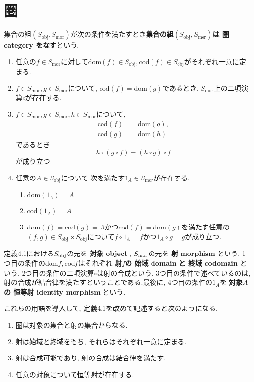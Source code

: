 \section{圏}
\begin{Def}
集合の組$(S_{\mathrm{obj}},S_{\mathrm{mor}})$が次の条件を満たすとき{\bf 集合の組$(S_{\mathrm{obj}},S_{\mathrm{mor}})$は
圏 category
をなす}という.
\begin{enumerate}
\item 任意の$f\in S_\mathrm{mor}$に対して$\mathrm{dom}(f)\in S_\mathrm{obj},\mathrm{cod}(f)\in S_\mathrm{obj}$がそれぞれ一意に定まる.
\item $f\in S_{\mathrm{mor}},g\in S_{\mathrm{mor}}$について,
$\mathrm{cod}(f)=\mathrm{dom}(g)$であるとき,
$S_{\mathrm{mor}}$上の二項演算$\circ$が存在する.
\item $f\in S_{\mathrm{mor}},g\in S_{\mathrm{mor}},h\in S_{\mathrm{mor}}$について, \begin{align*}
\mathrm{cod}(f)&=\mathrm{dom}(g),\\ \mathrm{cod}(g)&=\mathrm{dom}(h)
\end{align*}であるとき
\[
h\circ(g\circ f)=(h\circ g)\circ f
\]
が成り立つ.
\item 任意の$A\in S_{\mathrm{obj}}$について
次を満たす$1_A\in S_{\mathrm{mor}}$が存在する.
\begin{enumerate}
\item
$\mathrm{dom}(1_{A})=A$
\item
$\mathrm{cod}(1_A)=A$
\item $\mathrm{dom}(f)=\mathrm{cod} (g)=A$かつ$\mathrm{cod} (f)=\mathrm{dom}(g)$を満たす任意の$(f,g)\in S_{\mathrm{obj}}\times S_{\mathrm{obj}}$について$f\circ 1_A=f$かつ$1_A\circ g=g$が成り立つ.
\end{enumerate}
\end{enumerate}
\end{Def}
定義4.1における$S_{\rm obj}$の元を
{\bf 
対象 object
}, 
$S_{\rm mor}$の元を
{\bf 
射 morphism
}という.
1つ目の条件の$\mathrm{dom} f,\mathrm{cod} f$はそれぞれ
{\bf 射$f$の
始域 domain
と 
終域 codomain
}という. 
2つ目の条件の二項演算$\circ$は射の合成という. 3つ目の条件で述べているのは, 射の合成が結合律を満たすということである.最後に, 4つ目の条件の$1_A$を
{\bf 対象$A$の
恒等射 identity morphism
}という.

これらの用語を導入して, 定義4.1を改めて記述すると次のようになる.
\begin{enumerate}
\item
圏は対象の集合と射の集合からなる.
\item
射は始域と終域をもち, それらはそれぞれ一意に定まる.
\item
射は合成可能であり, 射の合成は結合律を満たす.
\item
任意の対象について恒等射が存在する.
\end{enumerate}

